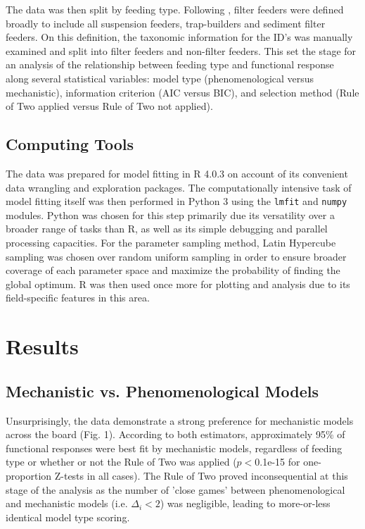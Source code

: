 \documentclass[11pt]{article}
\begin{document}
    The data was then split by feeding type. Following \citet{jeschke2004consumer}, filter feeders were defined broadly to include all suspension feeders, trap-builders and sediment filter feeders. On this definition, the taxonomic information for the ID's was manually examined and split into filter feeders and non-filter feeders. This set the stage for an analysis of the relationship between feeding type and functional response along several statistical variables: model type (phenomenological versus mechanistic), information criterion (AIC versus BIC), and selection method (Rule of Two applied versus Rule of Two not applied). 
    
    \subsection{Computing Tools}
    
    The data was prepared for model fitting in R 4.0.3 on account of its convenient data wrangling and exploration packages. The computationally intensive task of model fitting itself was then performed in Python 3 using the \texttt{lmfit} and \texttt{numpy} modules. Python was chosen for this step primarily due its versatility over a broader range of tasks than R, as well as its simple debugging and parallel processing capacities. For the parameter sampling method, Latin Hypercube sampling was chosen over random uniform sampling in order to ensure broader coverage of each parameter space and maximize the probability of finding the global optimum. 
    R was then used once more for plotting and analysis due to its field-specific features in this area.

    
    \section{Results}
    \subsection{Mechanistic vs. Phenomenological Models}
    
    Unsurprisingly, the data demonstrate a strong preference for mechanistic models across the board (Fig. 1). According to both estimators, approximately 95\% of functional responses were best fit by mechanistic models, regardless of feeding type or whether or not the Rule of Two was applied ($p<$0.1e-15 for one-proportion Z-tests in all cases). The Rule of Two proved inconsequential at this stage of the analysis as the number of 'close games' between phenomenological and mechanistic models (i.e. $\Delta_i<2$) was negligible, leading to more-or-less identical model type scoring.
    
\end{document}
